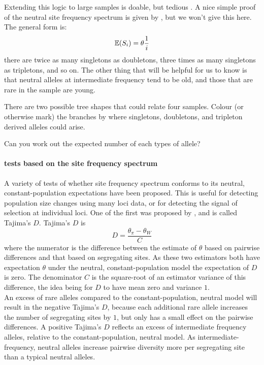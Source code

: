 Extending this logic to large samples is doable, but tedious
. A nice
simple proof of the neutral site frequency spectrum is given by
, but we won't give this here. The general form is: 
\begin{equation}
\mathbb{E}(S_i) = \theta \frac{1}{i}   \label{eqn:neutral_freq_spec}
\end{equation}
there are twice as many singletons as doubletons, three times as many
singletons as tripletons, and so on. The other thing that will be
helpful for us to know is that neutral alleles at intermediate frequency tend to be old, and
those that are rare in the sample are young.

\begin{question}
There are two possible tree shapes that could relate four
samples. Colour (or otherwise mark) the branches by where singletons,
doubletons, and tripleton derived alleles could arise. 

Can you work out the expected number of each types of allele?
\end{question}


\paragraph{tests based on the site frequency spectrum}
A variety of tests of whether site frequency spectrum conforms to its
neutral, constant-population expectations have been proposed. This is
useful for detecting population size changes using many loci data, or
for detecting the signal of selection at individual loci. One of
the first was proposed by \citeauthor{tajima:89}, and is called
Tajima's $D$. Tajima's $D$ is
\begin{equation}
D = \frac{\theta_{\pi}-\theta_{W}}{C}
\end{equation}
where the numerator is the difference between the estimate of
$\theta$ based on pairwise differences and that based on segregating
sites. As these two estimators both have expectation $\theta$ under
the neutral, constant-population model the expectation of $D$ is zero. The denominator $C$ is the square-root of an estimator
variance of this difference, the idea being for $D$ to have mean zero
and variance $1$. \\

An excess of rare alleles compared to the constant-population, neutral
model will result in the negative Tajima's $D$, because each
additional rare allele increases the number of segregating sites by
$1$, but only has a small effect on the pairwise differences. 
A positive Tajima's $D$ reflects an excess of intermediate frequency alleles, relative to
the  constant-population, neutral model. As intermediate-frequency, neutral alleles increase pairwise diversity
more per segregating site than a typical neutral alleles.


